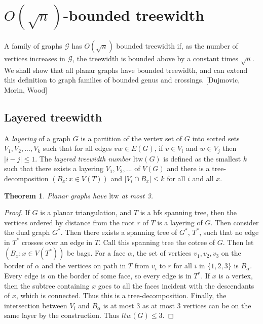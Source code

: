 \documentclass[]{article}
\newcommand{\ltw}{\text{ltw}}
\newtheorem{theorem}{Theorem}
\theoremstyle{definition}
\numberwithin{theorem}{section}
\numberwithin{equation}{section}
\begin{document}
\section{$O(\sqrt{n})$-bounded treewidth}
A family of graphs $\mathcal{G}$ has $O(\sqrt{n})$ bounded treewidth if, as the number of vertices increases in $\mathcal{G}$, the treewidth is bounded above by a constant times $\sqrt{n}$. We shall show that all planar graphs have bounded treewidth, and can extend this definition to graph families of bounded genus and crossings. [Dujmovic, Morin, Wood] 

\subsection{Layered treewidth}
A \textit{layering} of a graph $G$ is a partition of the vertex set of $G$ into sorted sets $V_1, V_2, ..., V_k$ such that for all edges $vw \in E(G)$, if $v \in V_i$ and $w \in V_j$ then $|i - j| \leq 1$. The \textit{layered treewidth number} $\ltw(G)$ is defined as the smallest $k$ such that there exists a layering $V_1, V_2, ...$ of $V(G)$ and there is a tree-decomposition $(B_x: x \in V(T))$ and $|V_i \cap B_x| \leq k$ for all $i$ and all $x$. 
\begin{theorem}
	Planar graphs have $\ltw$ at most 3. 
\end{theorem}
\begin{proof}
	If $G$ is a planar triangulation, and $T$ is a bfs spanning tree, then the vertices ordered by distance from the root $r$ of $T$ is a layering of $G$. Then consider the dual graph $G^*$. Then there exists a spanning tree of $G^*$, $T^*$, such that no edge in $T^*$ crosses over an edge in $T$. Call this spanning tree the cotree of $G$. Then let $\left( B_x: x \in V(T^*) \right)$ be bags. For a face $\alpha$, the set of vertices $v_1, v_2, v_3$ on the border of $\alpha$ and the vertices on path in $T$ from $v_i$ to $r$ for all $i$ in $\lbrace 1, 2, 3 \rbrace$ is $B_\alpha$. Every edge is on the border of some face, so every edge is in $T^*$. If $x$ is a vertex, then the subtree containing $x$ goes to all the faces incident with the descendants of $x$, which is connected. Thus this is a tree-decomposition. Finally, the intersection between $V_i$ and $B_\alpha$ is at most 3 as at most 3 vertices can be on the same layer by the construction. Thus $ltw(G) \leq 3$. 
\end{proof}
\end{document}
